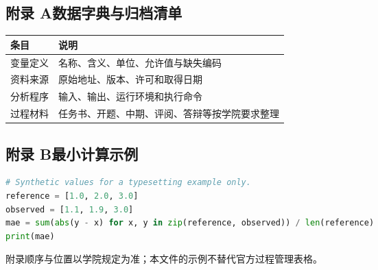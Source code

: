 \subsection*{附录 A\quad 数据字典与归档清单}
\begin{longtable}{lp{.65\linewidth}}\toprule 条目 & 说明\\\midrule\endhead
变量定义 & 名称、含义、单位、允许值与缺失编码\\
资料来源 & 原始地址、版本、许可和取得日期\\
分析程序 & 输入、输出、运行环境和执行命令\\
过程材料 & 任务书、开题、中期、评阅、答辩等按学院要求整理\\\bottomrule\end{longtable}
\subsection*{附录 B\quad 最小计算示例}
\begin{lstlisting}[language=Python]
# Synthetic values for a typesetting example only.
reference = [1.0, 2.0, 3.0]
observed = [1.1, 1.9, 3.0]
mae = sum(abs(y - x) for x, y in zip(reference, observed)) / len(reference)
print(mae)
\end{lstlisting}
附录顺序与位置以学院规定为准；本文件的示例不替代官方过程管理表格。
